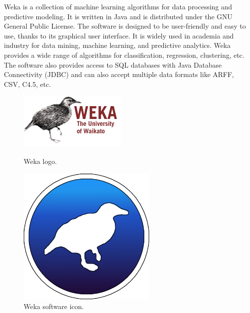 Weka is a collection of machine learning algorithms for data processing and predictive modeling. It is written in Java and
is distributed under the GNU General Public License. The software is designed to be user-friendly and easy to use, thanks
to its graphical user interface. It is widely used in academia and industry for data mining, machine learning, and predictive
analytics. Weka provides a wide range of algorithms for classification, regression, clustering, etc. The software also
provides access to SQL databases with Java Database Connectivity (JDBC) and can also accept multiple data formats like
ARFF, CSV, C4.5, etc.

\begin{figure}[H]
	\centering
	\begin{minipage}[t]{0.48\textwidth}
		\centering
		\includegraphics[width=1\linewidth]{../images/Weka_logo.png}
		\caption{Weka logo.}
		\label{fig:waka-logo}
	\end{minipage}\hfill
	\begin{minipage}[t]{0.48\textwidth}
		\centering
		\includegraphics[width=0.5\linewidth]{../images/weka-icon.png}
		\caption{Weka software icon.}
		\label{fig:waka-icon}
	\end{minipage}
\end{figure}

